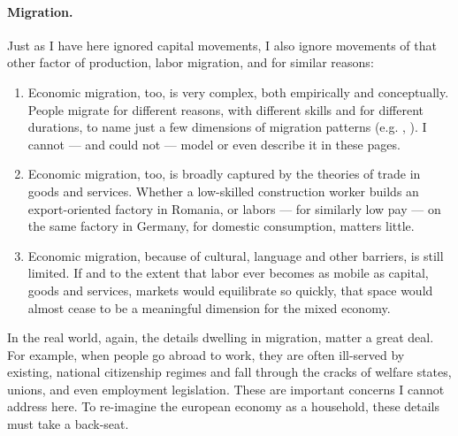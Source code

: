\documentclass[11pt,a4paper,oneside,openright]{article}
\begin{document}
\paragraph{Migration.} Just as I have here ignored capital movements, I also ignore movements of that other factor of production, labor migration, and for similar reasons:
\begin{enumerate}
	\item Economic migration, too, is very complex, both empirically and conceptually. People migrate for different reasons, with different skills and for different durations, to name just a few dimensions of migration patterns (e.g. \citealt{DeSimone2008}, \citealt{Bems2008}). I cannot --- and could not --- model or even describe it in these pages.
	\item Economic migration, too, is broadly captured by the theories of trade in goods and services. Whether a low-skilled construction worker builds an export-oriented factory in Romania, or labors --- for similarly low pay --- on the same factory in Germany, for domestic consumption, matters little. 
	\item Economic migration, because of cultural, language and other barriers, is still limited. If and to the extent that labor ever becomes as mobile as capital, goods and services, markets would equilibrate so quickly, that space would almost cease to be a meaningful dimension for the mixed economy.
\end{enumerate}

In the real world, again, the details dwelling in migration, matter a great deal. For example, when people go abroad to work, they are often ill-served by existing, national citizenship regimes and fall through the cracks of welfare states, unions, and even employment legislation. These are important concerns I cannot address here. To re-imagine the european economy as a household, these details must take a back-seat.
\end{document}
